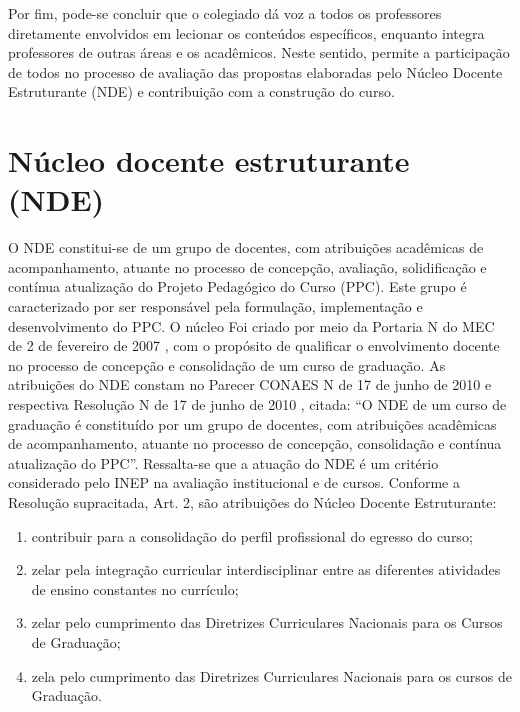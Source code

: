 Por fim, pode-se concluir que o colegiado dá voz a todos os professores diretamente envolvidos em lecionar os conteúdos específicos, enquanto integra professores de outras áreas e os acadêmicos. Neste sentido, permite a participação de todos no processo de avaliação das propostas elaboradas pelo Núcleo Docente Estruturante (NDE) e contribuição com a construção do curso.


\section{Núcleo docente estruturante (NDE)}

O NDE constitui-se de um grupo de docentes, com atribuições acadêmicas de acompanhamento, atuante no processo de concepção, avaliação, solidificação e contínua atualização do Projeto Pedagógico do Curso (PPC). Este grupo é caracterizado por ser responsável pela formulação, implementação e desenvolvimento do PPC. O núcleo Foi criado por meio da Portaria N do MEC de 2 de fevereiro de 2007 \cite{portaria147mec}, com o propósito de qualificar o envolvimento docente no processo de concepção e consolidação de um curso de graduação. As atribuições do NDE constam no Parecer CONAES N de 17 de junho de 2010 \cite{parecerconaes4} e respectiva Resolução N de 17 de junho de 2010 \cite{resconaes1}, citada: ``O NDE de um curso de graduação é constituído por um grupo de docentes, com atribuições acadêmicas de acompanhamento, atuante no processo de concepção, consolidação e contínua atualização do PPC''. Ressalta-se que a atuação do NDE é um critério considerado pelo INEP na avaliação institucional e de cursos. Conforme a Resolução supracitada, Art. 2\textordmasculine, são atribuições do Núcleo Docente Estruturante: 

\begin{enumerate}
    \item contribuir para a consolidação do perfil profissional do egresso do curso;
    \item zelar pela integração curricular interdisciplinar entre as diferentes atividades de ensino constantes no currículo;
    \item zelar pelo cumprimento das Diretrizes Curriculares Nacionais para os Cursos de Graduação;
    \item zela pelo cumprimento das Diretrizes Curriculares Nacionais para os cursos de Graduação.
\end{enumerate}

